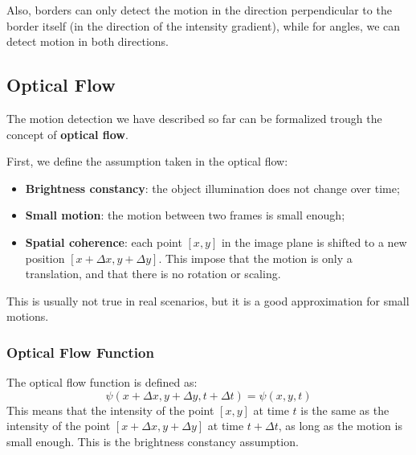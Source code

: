 Also, borders can only detect the motion in the direction perpendicular to the border itself (in the direction of the intensity gradient), 
while for angles, we can detect motion in both directions.

\subsection{Optical Flow}
The motion detection we have described so far can be formalized trough the concept of \textbf{optical flow}.

First, we define the assumption taken in the optical flow:
\begin{itemize}
    \item \textbf{Brightness constancy}: the object illumination does not change over time;
    \item \textbf{Small motion}: the motion between two frames is small enough;
    \item \textbf{Spatial coherence}: each point $[x, y]$ in the image plane is shifted to a new position $[x + \Delta x, y + \Delta y]$.
    This impose that the motion is only a translation, and that there is no rotation or scaling.
\end{itemize}
This is usually not true in real scenarios, but it is a good approximation for small motions.

\subsubsection{Optical Flow Function}
The optical flow function is defined as:
\begin{equation}
    \label{eq:optical_flow}
    \psi(x + \Delta x, y + \Delta y, t + \Delta t) = \psi(x, y, t)
\end{equation}
This means that the intensity of the point $[x, y]$ at time $t$ is the same as the intensity of the point $[x + \Delta x, y + \Delta y]$ at time $t + \Delta t$,
as long as the motion is small enough. This is the brightness constancy assumption.

